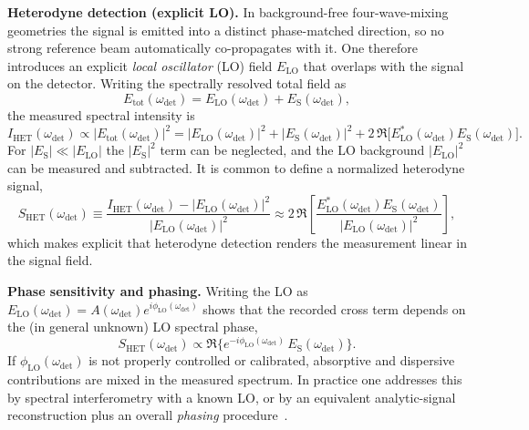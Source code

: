 \medskip

\textbf{Heterodyne detection (explicit LO).}
In background-free four-wave-mixing geometries the signal is emitted into a distinct phase-matched direction, so no strong reference beam automatically co-propagates with it. One therefore introduces an explicit \emph{local oscillator} (LO) field $E_{\mathrm{LO}}$ that overlaps with the signal on the detector.
Writing the spectrally resolved total field as
\begin{equation}
	E_{\mathrm{tot}}(\omega_{\mathrm{det}}) = E_{\mathrm{LO}}(\omega_{\mathrm{det}}) + E_{\mathrm{S}}(\omega_{\mathrm{det}}),
	\label{eq:spctr_heterodyne_total_field_freq}
\end{equation}
the measured spectral intensity is
\begin{equation}
	I_{\mathrm{HET}}(\omega_{\mathrm{det}})
	\propto
	\big|E_{\mathrm{tot}}(\omega_{\mathrm{det}})\big|^2
	=
	|E_{\mathrm{LO}}(\omega_{\mathrm{det}})|^2
	+ |E_{\mathrm{S}}(\omega_{\mathrm{det}})|^2
	+ 2\,\Re\big[E_{\mathrm{LO}}^*(\omega_{\mathrm{det}})E_{\mathrm{S}}(\omega_{\mathrm{det}})\big].
	\label{eq:spctr_heterodyne_intensity_expanded_freq}
\end{equation}
For $|E_{\mathrm{S}}|\ll|E_{\mathrm{LO}}|$ the $|E_{\mathrm{S}}|^2$ term can be neglected, and the LO background $|E_{\mathrm{LO}}|^2$ can be measured and subtracted. It is common to define a normalized heterodyne signal,
\begin{equation}
	S_{\mathrm{HET}}(\omega_{\mathrm{det}})
	\equiv
	\frac{I_{\mathrm{HET}}(\omega_{\mathrm{det}})-|E_{\mathrm{LO}}(\omega_{\mathrm{det}})|^2}{|E_{\mathrm{LO}}(\omega_{\mathrm{det}})|^2}
	\approx 2\,\Re\left[\frac{E_{\mathrm{LO}}^*(\omega_{\mathrm{det}})E_{\mathrm{S}}(\omega_{\mathrm{det}})}{|E_{\mathrm{LO}}(\omega_{\mathrm{det}})|^2}\right],
	\label{eq:spctr_heterodyne_signal_normalized}
\end{equation}
which makes explicit that heterodyne detection renders the measurement linear in the signal field.

\medskip

\textbf{Phase sensitivity and phasing.}
Writing the LO as $E_{\mathrm{LO}}(\omega_{\mathrm{det}})=A(\omega_{\mathrm{det}})e^{i\phi_{\mathrm{LO}}(\omega_{\mathrm{det}})}$ shows that the recorded cross term depends on the (in general unknown) LO spectral phase,
\begin{equation}
	S_{\mathrm{HET}}(\omega_{\mathrm{det}})
	\propto \Re\Big\{e^{-i\phi_{\mathrm{LO}}(\omega_{\mathrm{det}})}\,E_{\mathrm{S}}(\omega_{\mathrm{det}})\Big\}.
	\label{eq:spctr_heterodyne_phase_sensitive}
\end{equation}
If $\phi_{\mathrm{LO}}(\omega_{\mathrm{det}})$ is not properly controlled or calibrated, absorptive and dispersive contributions are mixed in the measured spectrum. In practice one addresses this by spectral interferometry with a known LO, or by an equivalent analytic-signal reconstruction plus an overall \emph{phasing} procedure~\cite{hybletal1998twodimensionalelectronicspectroscopy}.

